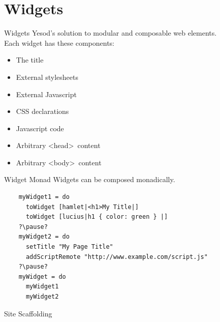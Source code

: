 \documentclass[pdf]{beamer}
\begin{document}
\section{Widgets}
\begin{frame}{Widgets}
  Yesod's solution to modular and composable web elements. \\
  Each widget has these components:\\
  \begin{itemize}
  \item<1-> The title
  \item<2-> External stylesheets
  \item<2-> External Javascript
  \item<3-> CSS declarations
  \item<3-> Javascript code
  \item<4-> Arbitrary \textless head\textgreater\ content
  \item<4-> Arbitrary \textless body\textgreater\ content
  \end{itemize}
\end{frame}

\begin{frame}[fragile]{Widget Monad}
  Widgets can be composed monadically.
  \begin{verbatim}
    myWidget1 = do
      toWidget [hamlet|<h1>My Title|]
      toWidget [lucius|h1 { color: green } |]
    ?\pause?
    myWidget2 = do
      setTitle "My Page Title"
      addScriptRemote "http://www.example.com/script.js"
    ?\pause?
    myWidget = do
      myWidget1
      myWidget2
  \end{verbatim}
\end{frame}

\begin{frame}{Site Scaffolding}
\end{frame}

\end{document}
